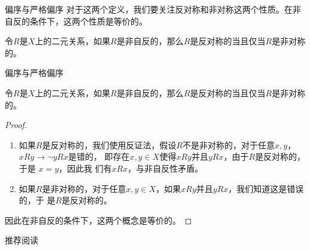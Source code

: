 \documentclass[presentation]{beamer}
\begin{document}
\begin{frame}[label={sec:orgb07f03d}]{偏序与严格偏序}
对于这两个定义，我们要关注反对称和非对称这两个性质。在非自反的条件下，这两个性质是等价的。

\begin{proposition}[]
令\(R\)是\(X\)上的二元关系，如果\(R\)是非自反的，那么\(R\)是反对称的当且仅当\(R\)是非对称的。
\end{proposition}
\end{frame}
\begin{frame}[label={sec:org84ddc29}]{偏序与严格偏序}
\begin{proposition}[]
令\(R\)是\(X\)上的二元关系，如果\(R\)是非自反的，那么\(R\)是反对称的当且仅当\(R\)是非对称的。
\end{proposition}

\begin{proof}
\begin{enumerate}
\item 如果\(R\)是反对称的，我们使用反证法，假设\(R\)不是非对称的，对于任意\(x,y\)，\(xRy\to\neg yRx\)是错的，
即存在\(x,y\in X\)使得\(xRy\)并且\(yRx\)，由于\(R\)是反对称的，于是 \(x=y\)，因此我
们有\(xRx\)，与非自反性矛盾。
\item 如果\(R\)是非对称的，对于任意\(x,y\in X\)，如果\(xRy\)并且\(yRx\)，我们知道这是错误的，于
是\(R\)是反对称的。
\end{enumerate}


因此在非自反的条件下，这两个概念是等价的。
\end{proof}
\end{frame}

\begin{frame}[label={sec:orgaf4146d}]{推荐阅读}
\href{https://web.stanford.edu/class/archive/cs/cs103/cs103.1198/handouts/070\%20Guide\%20to\%20Set\%20Theory\%20Proofs.pdf}{\color{blue}{Guide to proofs on sets}}
\end{frame}
\end{document}
